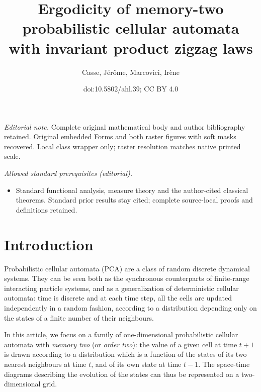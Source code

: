 \documentclass[10pt]{amsart}
\title{Ergodicity of memory-two probabilistic cellular automata with invariant product zigzag laws}
\author{Casse, Jérôme, Marcovici, Irène}
\date{doi:10.5802/ahl.39; CC BY 4.0}
\theoremstyle{definition}\newtheorem{defi}[theo]{Definition}\newtheorem{rema}[theo]{Remark}\newtheorem{exam}[theo]{Example}\newtheorem{exem}[theo]{Example}\newtheorem{nota}[theo]{Notation}
\newcounter{a}
\begin{document}
\maketitle
\noindent\textit{Editorial note.} Complete original mathematical body and author bibliography retained. Original embedded Forms and both raster figures with soft masks recovered. Local class wrapper only; raster resolution matches native printed scale.\par\medskip
\noindent\textit{Allowed standard prerequisites (editorial).}\begin{itemize}
\item Standard functional analysis, measure theory and the author-cited classical theorems. Standard prior results stay cited; complete source-local proofs and definitions retained.
\end{itemize}\medskip

\section{Introduction}

Probabilistic cellular automata (PCA) are a class of random discrete dynamical systems. They can be seen both as the synchronous counterparts of finite-range interacting particle systems, and as a generalization of deterministic cellular automata: time is discrete and at each time step, all the cells are updated independently in a random fashion, according to a distribution depending only on the states of a finite number of their neighbours.

In this article, we focus on a family of one-dimensional probabilistic cellular automata with \emph{memory two} (or \emph{order two}): the value of a given cell at time $t+1$ is drawn according to a distribution which is a function of the states of its two nearest neighbours at time $t$, and of its own state at time $t-1$. The space-time diagrams describing the evolution of the states can thus be represented on a two-dimensional grid.
\end{document}
